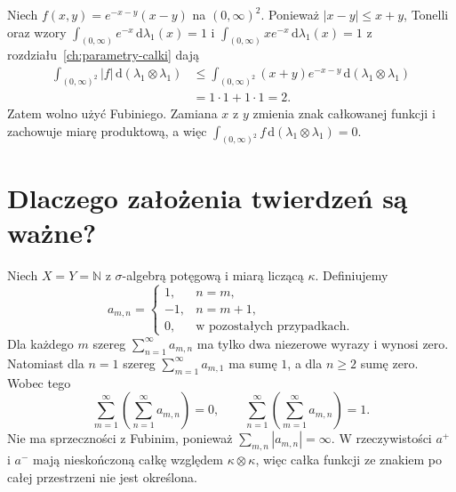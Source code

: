 \begin{przyklad}
Niech $f(x,y)=e^{-x-y}(x-y)$ na $(0,\infty)^2$.
Ponieważ $|x-y|\le x+y$, Tonelli oraz wzory
$\int_{(0,\infty)}e^{-x}\,\mathrm d\lambda_1(x)=1$ i
$\int_{(0,\infty)}xe^{-x}\,\mathrm d\lambda_1(x)=1$
z rozdziału~\ref{ch:parametry-calki} dają
\begin{align*}
\int_{(0,\infty)^2}|f|\,
\mathrm d(\lambda_1\otimes\lambda_1)
&\le\int_{(0,\infty)^2}(x+y)e^{-x-y}
\,\mathrm d(\lambda_1\otimes\lambda_1)\\
&=1\cdot1+1\cdot1=2.
\end{align*}
Zatem wolno użyć Fubiniego. Zamiana $x$ z $y$
zmienia znak całkowanej funkcji i zachowuje
miarę produktową, a więc
$\int_{(0,\infty)^2}f\,\mathrm d(\lambda_1\otimes\lambda_1)=0$.
\end{przyklad}

\section{Dlaczego założenia twierdzeń są ważne?}

\begin{przyklad}
\label{ex:nonabs-fubini-12}
Niech $X=Y=\mathbb N$ z $\sigma$-algebrą potęgową
i miarą liczącą $\kappa$. Definiujemy
\[
a_{m,n}=\begin{cases}
1,&n=m,\\
-1,&n=m+1,\\
0,&\text{w pozostałych przypadkach}.
\end{cases}
\]
Dla każdego $m$ szereg $\sum_{n=1}^\infty a_{m,n}$
ma tylko dwa niezerowe wyrazy i wynosi zero. Natomiast
dla $n=1$ szereg $\sum_{m=1}^\infty a_{m,1}$
ma sumę $1$, a dla $n\ge2$ sumę zero.
Wobec tego
\[
\sum_{m=1}^\infty\left(\sum_{n=1}^\infty a_{m,n}\right)=0,
\qquad
\sum_{n=1}^\infty\left(\sum_{m=1}^\infty a_{m,n}\right)=1.
\]
Nie ma sprzeczności z Fubinim, ponieważ
$\sum_{m,n}|a_{m,n}|=\infty$.
W rzeczywistości $a^+$ i $a^-$ mają nieskończoną
całkę względem $\kappa\otimes\kappa$, więc
całka funkcji ze znakiem po całej przestrzeni
nie jest określona.
\end{przyklad}

